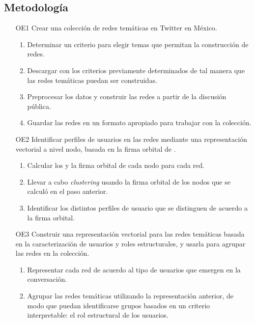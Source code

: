 \subsection{Metodología}
\label{sec:intro:organización}
\begin{enumerate}
    \item[OE1] Crear una colección de redes temáticas en Twitter en México.
    \begin{enumerate}
        \item Determinar un criterio para elegir temas que permitan la construcción de redes.
        \item Descargar \tweets con los criterios previamente determinados de tal manera que las redes temáticas puedan ser construidas.
        \item Preprocesar los datos y construir las redes a partir de la discusión pública.
        \item Guardar las redes en un formato apropiado para trabajar con la colección.
    \end{enumerate}
    \item[OE2] Identificar perfiles de usuarios en las redes mediante una representación vectorial a nivel nodo, basada en la firma orbital de \graphlets. 
    \begin{enumerate}
        \item Calcular los \graphlets y la firma orbital de cada nodo para cada red.
         \item Llevar a cabo \textit{clustering} usando la firma orbital de los nodos que se calculó en el paso anterior.
        \item Identificar los distintos perfiles de usuario que se distinguen de acuerdo a la firma orbital.
    \end{enumerate}
    \item[OE3] Construir una representación vectorial para las redes temáticas basada en la caracterización de usuarios y roles estructurales, y usarla para agrupar las redes en la colección.
    \begin{enumerate}
        \item Representar cada red de acuerdo al tipo de usuarios que emergen en la conversación. 
        \item Agrupar las redes temáticas utilizando la representación anterior, de modo que puedan identificarse grupos basados en un criterio interpretable: el rol estructural de los usuarios. 
    \end{enumerate}
\end{enumerate}


